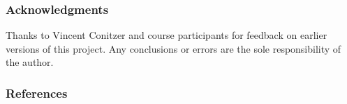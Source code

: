 \documentclass[12pt,letterpaper]{article} %
\begin{document}



\subsubsection*{Acknowledgments}

Thanks to Vincent Conitzer and course participants for feedback on earlier versions of this project. Any conclusions or errors are the sole responsibility of the author.

\subsubsection*{References}



\begingroup
\renewcommand{\section}[2]{}


\endgroup
\end{document}
